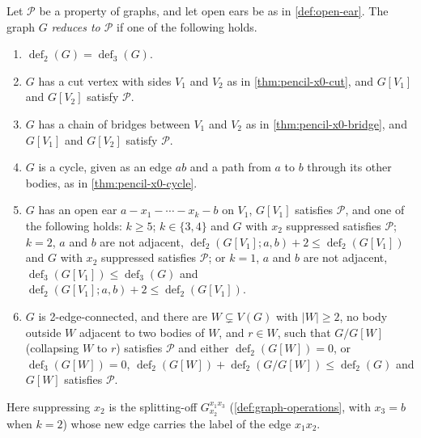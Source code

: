 \begin{definition}
  \label{def:pencil-x0-reduces}
  \leanok
  Let $\mathcal P$ be a property of graphs, and let open ears be as in
  \cref{def:open-ear}. The graph $G$ \emph{reduces to
  $\mathcal P$} if one of the following holds.
  \begin{enumerate}
    \item $\operatorname{def}_2(G) = \operatorname{def}_3(G)$.
    \item $G$ has a cut vertex with sides $V_1$ and $V_2$ as in
      \cref{thm:pencil-x0-cut}, and $G[V_1]$ and $G[V_2]$ satisfy
      $\mathcal P$.
    \item $G$ has a chain of bridges between $V_1$ and $V_2$ as in
      \cref{thm:pencil-x0-bridge}, and $G[V_1]$ and $G[V_2]$ satisfy
      $\mathcal P$.
    \item $G$ is a cycle, given as an edge $ab$ and a path from $a$ to
      $b$ through its other bodies, as in \cref{thm:pencil-x0-cycle}.
    \item $G$ has an open ear $a - x_1 - \cdots - x_k - b$ on $V_1$,
      $G[V_1]$ satisfies $\mathcal P$, and one of the following holds:
      $k \ge 5$; $k \in \{3, 4\}$ and $G$ with $x_2$ suppressed
      satisfies $\mathcal P$; $k = 2$, $a$ and $b$ are not adjacent,
      $\operatorname{def}_2(G[V_1]; a, b) + 2 \le
      \operatorname{def}_2(G[V_1])$ and $G$ with $x_2$ suppressed
      satisfies $\mathcal P$; or $k = 1$, $a$ and $b$ are not adjacent,
      $\operatorname{def}_3(G[V_1]) \le \operatorname{def}_3(G)$ and
      $\operatorname{def}_2(G[V_1]; a, b) + 2 \le
      \operatorname{def}_2(G[V_1])$.
    \item $G$ is 2-edge-connected, and there are $W \subsetneq V(G)$
      with $|W| \ge 2$, no body outside $W$ adjacent to two bodies of
      $W$, and $r \in W$, such that $G/G[W]$ (collapsing $W$ to $r$)
      satisfies $\mathcal P$ and either $\operatorname{def}_2(G[W]) =
      0$, or $\operatorname{def}_3(G[W]) = 0$,
      $\operatorname{def}_2(G[W]) + \operatorname{def}_2(G/G[W]) \le
      \operatorname{def}_2(G)$ and $G[W]$ satisfies $\mathcal P$.
  \end{enumerate}
  Here suppressing $x_2$ is the splitting-off $G_{x_2}^{x_1 x_3}$
  (\cref{def:graph-operations}, with $x_3 = b$ when $k = 2$) whose new
  edge carries the label of the edge $x_1 x_2$.
\end{definition}

